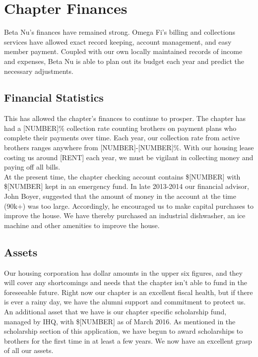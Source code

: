 \chapter{Chapter Finances}

  Beta Nu's finances have remained strong. Omega Fi's billing and collections services have allowed exact record keeping, account management, and easy member payment. Coupled with our own locally maintained records of income and expenses, Beta Nu is able to plan out its budget each year and predict the necessary adjustments.

  \section*{Financial Statistics}
    This has allowed the chapter's finances to continue to prosper. The chapter has had a [NUMBER]\% collection rate counting brothers on payment plans who complete their payments over time. Each year, our collection rate from active brothers ranges anywhere from [NUMBER]-[NUMBER]\%. With our housing lease costing us around [RENT] each year, we must be vigilant in collecting money and paying off all bills. \\

    At the present time, the chapter checking account contains \$[NUMBER] with \$[NUMBER] kept in an emergency fund. In late 2013-2014 our financial advisor, John Boyer, suggested that the amount of money in the account at the time (90k+) was too large. Accordingly, he encouraged us to make capital purchases to improve the house. We have thereby purchased an industrial dishwasher, an ice machine and other amenities to improve the house.
    
  \section*{Assets}
    Our housing corporation has dollar amounts in the upper six figures, and they will cover any shortcomings and needs that the chapter isn't able to fund in the foreseeable future. Right now our chapter is an excellent fiscal health, but if there is ever a rainy day, we have the alumni support and commitment to protect us. An additional asset that we have is our chapter specific scholarship fund, managed by IHQ, with \$[NUMBER] as of March 2016. As mentioned in the scholarship section of this application, we have begun to award scholarships to brothers for the first time in at least a few years. We now have an excellent grasp of all our assets.
    
